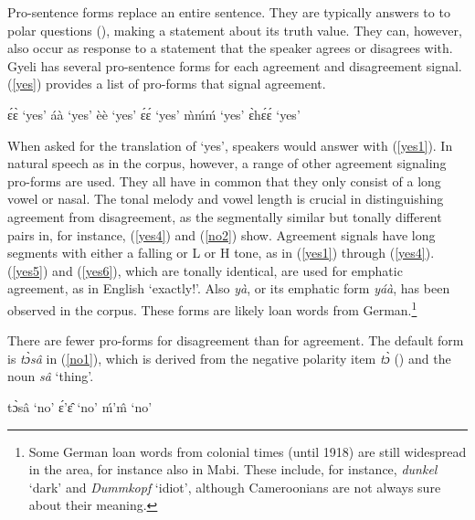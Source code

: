 Pro-sentence forms replace an entire sentence. They are typically answers to to polar questions (), making a statement about its truth value. They can, however, also occur as response to a statement that the speaker agrees or disagrees with. Gyeli has several pro-sentence forms for each agreement and disagreement signal. (\ref{yes}) provides a list of pro-forms that signal agreement.

\begin{exe} 
\ex\label{yes}
\begin{xlist}
\ex\label{yes1} ɛ́ɛ̀ `yes'
\ex\label{yes2} áà `yes' 
\ex\label{yes3} èè `yes' 
\ex\label{yes4} ɛ́ɛ́ `yes' 
\ex\label{yes5} m̀ḿḿ `yes'
\ex\label{yes6} ɛ̀hɛ́ɛ́  `yes'
\end{xlist}
\end{exe}

When asked for the translation of `yes', speakers would answer with (\ref{yes1}). In natural speech as in the corpus, however, a range of other agreement signaling pro-forms are used. They all have in common that they only consist of a long vowel or nasal. The tonal melody and vowel length is crucial in distinguishing agreement from disagreement, as the segmentally similar but tonally different pairs in, for instance, (\ref{yes4}) and (\ref{no2}) show. Agreement signals have long segments with either a  falling  or L or H tone, as in  (\ref{yes1}) through (\ref{yes4}). (\ref{yes5}) and (\ref{yes6}), which are tonally identical, are used for emphatic agreement, as in English `exactly!'.
Also {\itshape yà}, or its emphatic form {\itshape yáà}, has been observed in the corpus. These forms are likely loan words from German.\footnote{Some German loan words from colonial times (until 1918) are still widespread in the area, for instance also in Mabi. These include, for instance, {\itshape dunkel} `dark' and {\itshape Dummkopf} `idiot', although Cameroonians are not always sure about their meaning.}

There are fewer pro-forms for disagreement than for agreement. The default form is {\itshape tɔ̀sâ} in (\ref{no1}), which is derived from the negative polarity item {\itshape tɔ̀} () and the noun {\itshape sâ} `thing'.

\begin{exe} 
\ex\label{no}
\begin{xlist}
\ex\label{no1} tɔ̀sâ `no'
\ex\label{no2} ɛ́'ɛ̂ `no'
\ex\label{no3} ḿ'm̂ `no'
\end{xlist}
\end{exe}

